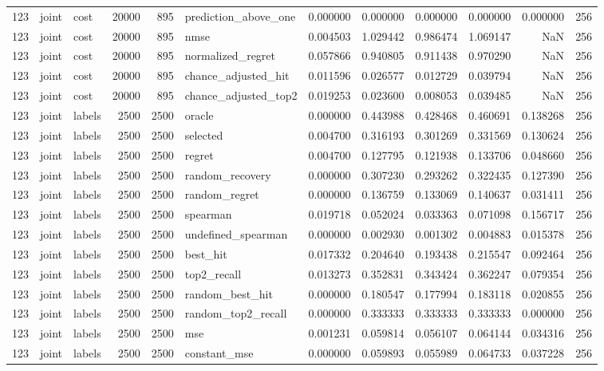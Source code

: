 \begin{tabular}{rllrrlrrrrrr}
123 & joint & cost & 20000 & 895 & prediction_above_one & 0.000000 & 0.000000 & 0.000000 & 0.000000 & 0.000000 & 256 \\
123 & joint & cost & 20000 & 895 & nmse & 0.004503 & 1.029442 & 0.986474 & 1.069147 & NaN & 256 \\
123 & joint & cost & 20000 & 895 & normalized_regret & 0.057866 & 0.940805 & 0.911438 & 0.970290 & NaN & 256 \\
123 & joint & cost & 20000 & 895 & chance_adjusted_hit & 0.011596 & 0.026577 & 0.012729 & 0.039794 & NaN & 256 \\
123 & joint & cost & 20000 & 895 & chance_adjusted_top2 & 0.019253 & 0.023600 & 0.008053 & 0.039485 & NaN & 256 \\
123 & joint & labels & 2500 & 2500 & oracle & 0.000000 & 0.443988 & 0.428468 & 0.460691 & 0.138268 & 256 \\
123 & joint & labels & 2500 & 2500 & selected & 0.004700 & 0.316193 & 0.301269 & 0.331569 & 0.130624 & 256 \\
123 & joint & labels & 2500 & 2500 & regret & 0.004700 & 0.127795 & 0.121938 & 0.133706 & 0.048660 & 256 \\
123 & joint & labels & 2500 & 2500 & random_recovery & 0.000000 & 0.307230 & 0.293262 & 0.322435 & 0.127390 & 256 \\
123 & joint & labels & 2500 & 2500 & random_regret & 0.000000 & 0.136759 & 0.133069 & 0.140637 & 0.031411 & 256 \\
123 & joint & labels & 2500 & 2500 & spearman & 0.019718 & 0.052024 & 0.033363 & 0.071098 & 0.156717 & 256 \\
123 & joint & labels & 2500 & 2500 & undefined_spearman & 0.000000 & 0.002930 & 0.001302 & 0.004883 & 0.015378 & 256 \\
123 & joint & labels & 2500 & 2500 & best_hit & 0.017332 & 0.204640 & 0.193438 & 0.215547 & 0.092464 & 256 \\
123 & joint & labels & 2500 & 2500 & top2_recall & 0.013273 & 0.352831 & 0.343424 & 0.362247 & 0.079354 & 256 \\
123 & joint & labels & 2500 & 2500 & random_best_hit & 0.000000 & 0.180547 & 0.177994 & 0.183118 & 0.020855 & 256 \\
123 & joint & labels & 2500 & 2500 & random_top2_recall & 0.000000 & 0.333333 & 0.333333 & 0.333333 & 0.000000 & 256 \\
123 & joint & labels & 2500 & 2500 & mse & 0.001231 & 0.059814 & 0.056107 & 0.064144 & 0.034316 & 256 \\
123 & joint & labels & 2500 & 2500 & constant_mse & 0.000000 & 0.059893 & 0.055989 & 0.064733 & 0.037228 & 256 \\

\end{tabular}
